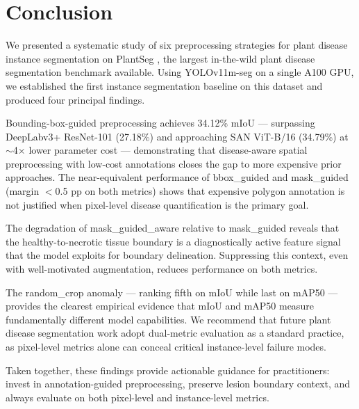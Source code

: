 \documentclass[preprint,12pt]{elsarticle}
\begin{document}
\section{Conclusion}
\label{sec:conclusion}

We presented a systematic study of six preprocessing strategies for plant disease instance segmentation on PlantSeg \citep{plantseg2024}, the largest in-the-wild plant disease segmentation benchmark available. Using YOLOv11m-seg on a single A100 GPU, we established the first instance segmentation baseline on this dataset and produced four principal findings.

Bounding-box-guided preprocessing achieves 34.12\% mIoU --- surpassing DeepLabv3+ ResNet-101 (27.18\%) and approaching SAN ViT-B/16 (34.79\%) at $\sim$4$\times$ lower parameter cost --- demonstrating that disease-aware spatial preprocessing with low-cost annotations closes the gap to more expensive prior approaches. The near-equivalent performance of bbox\_guided and mask\_guided (margin $<$0.5 pp on both metrics) shows that expensive polygon annotation is not justified when pixel-level disease quantification is the primary goal.

The degradation of mask\_guided\_aware relative to mask\_guided reveals that the healthy-to-necrotic tissue boundary is a diagnostically active feature signal that the model exploits for boundary delineation. Suppressing this context, even with well-motivated augmentation, reduces performance on both metrics.

The random\_crop anomaly --- ranking fifth on mIoU while last on mAP50 --- provides the clearest empirical evidence that mIoU and mAP50 measure fundamentally different model capabilities. We recommend that future plant disease segmentation work adopt dual-metric evaluation as a standard practice, as pixel-level metrics alone can conceal critical instance-level failure modes.

Taken together, these findings provide actionable guidance for practitioners: invest in annotation-guided preprocessing, preserve lesion boundary context, and always evaluate on both pixel-level and instance-level metrics.



\end{document}
